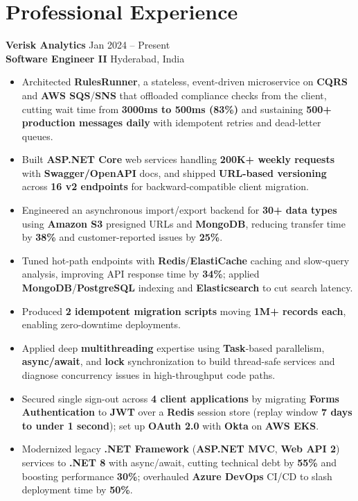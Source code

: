 \documentclass[letterpaper,10pt]{article}
\begin{document}
\section*{Professional Experience}

\textbf{Verisk Analytics} \hfill Jan 2024 -- Present \\
\textbf{Software Engineer II} \hfill Hyderabad, India
\begin{itemize}
    \item Architected \textbf{RulesRunner}, a stateless, event-driven microservice on \textbf{CQRS} and \textbf{AWS SQS}/\textbf{SNS} that offloaded compliance checks from the client, cutting wait time from \textbf{3000ms to 500ms (83\%)} and sustaining \textbf{500+ production messages daily} with idempotent retries and dead-letter queues.
    \item Built \textbf{ASP.NET Core} web services handling \textbf{200K+ weekly requests} with \textbf{Swagger/OpenAPI} docs, and shipped \textbf{URL-based versioning} across \textbf{16 v2 endpoints} for backward-compatible client migration.
    \item Engineered an asynchronous import/export backend for \textbf{30+ data types} using \textbf{Amazon S3} presigned URLs and \textbf{MongoDB}, reducing transfer time by \textbf{38\%} and customer-reported issues by \textbf{25\%}.
    \item Tuned hot-path endpoints with \textbf{Redis}/\textbf{ElastiCache} caching and slow-query analysis, improving API response time by \textbf{34\%}; applied \textbf{MongoDB}/\textbf{PostgreSQL} indexing and \textbf{Elasticsearch} to cut search latency.
    \item Produced \textbf{2 idempotent migration scripts} moving \textbf{1M+ records each}, enabling zero-downtime deployments.
    \item Applied deep \textbf{multithreading} expertise using \textbf{Task}-based parallelism, \textbf{async/await}, and \textbf{lock} synchronization to build thread-safe services and diagnose concurrency issues in high-throughput code paths.
    \item Secured single sign-out across \textbf{4 client applications} by migrating \textbf{Forms Authentication} to \textbf{JWT} over a \textbf{Redis} session store (replay window \textbf{7 days to under 1 second}); set up \textbf{OAuth 2.0} with \textbf{Okta} on \textbf{AWS EKS}.
    \item Modernized legacy \textbf{.NET Framework} (\textbf{ASP.NET MVC}, \textbf{Web API 2}) services to \textbf{.NET 8} with async/await, cutting technical debt by \textbf{55\%} and boosting performance \textbf{30\%}; overhauled \textbf{Azure DevOps} CI/CD to slash deployment time by \textbf{50\%}.

\end{itemize}
\end{document}
